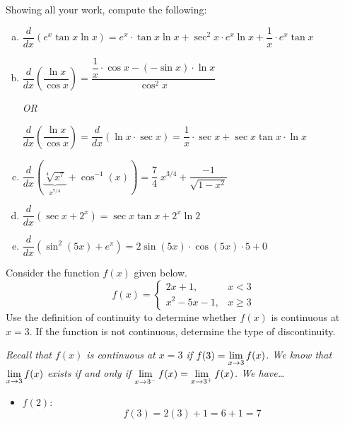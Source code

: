 \documentclass[12pt,letterpaper]{exam}
\begin{document}
\begin{questions}
\newpage
\question[20] Showing all your work, compute the following: \par\vspace{0.5cm}
	\begin{enumerate}[(a)]
	\item $\dfrac{d}{dx} \left(e^x \tan x \ln x \right)= e^x \cdot \tan x \ln x + \sec^2 x \cdot e^x \ln x + \dfrac{1}{x} \cdot e^x \tan x$ \vfill
	\item $\dfrac{d}{dx} \left( \dfrac{\ln x}{\cos x} \right)= \dfrac{\dfrac{1}{x} \cdot \cos x - (-\sin x) \cdot \ln x}{\cos^2 x}$ \par\vspace{0.5cm}
	
	\hspace{3cm} {\itshape OR} \par\vspace{0.5cm}
	
	$\dfrac{d}{dx} \left( \dfrac{\ln x}{\cos x} \right)= \dfrac{d}{dx} (\ln x \cdot \sec x )= \dfrac{1}{x} \cdot \sec x + \sec x \tan x \cdot \ln x$ \par\vspace{0.65cm}
	
	\item $\dfrac{d}{dx} \left( \underbrace{\sqrt[4]{x^7}}_{x^{7/4}} + \cos^{-1}(x) \right)= \dfrac{7}{4}\; x^{3/4} + \dfrac{-1}{\sqrt{1 - x^2}}$ \vfill
	\item $\dfrac{d}{dx} \left( \sec x + 2^x \right)= \sec x \tan x + 2^x \ln 2$ \vfill
	\item $\dfrac{d}{dx} \left( \sin^2(5x) + e^\pi \right)= 2 \sin(5x) \cdot \cos(5x) \cdot 5 + 0$ \vfill
	\end{enumerate}



\newpage
\question[20] Consider the function $f(x)$ given below.
	\[
	f(x)= 
	\begin{cases}
	2x + 1, & x < 3 \\
	x^2 - 5x - 1, & x \geq 3
	\end{cases}
	\]
Use the definition of continuity to determine whether $f(x)$ is continuous at $x= 3$. If the function is not continuous, determine the type of discontinuity. \pspace

{\itshape \tsol Recall that $f(x)$ is continuous at $x= 3$ if $\displaystyle f(3)= \lim_{x \to 3} f(x)$. We know that $\displaystyle\lim_{x \to 3} f(x)$ exists if and only if $\displaystyle\lim_{x \to 3^-} f(x)= \lim_{x \to 3^+} f(x)$. We have\dots
	\begin{itemize}
	\item $f(2)$: 
		\[
		f(3)= 2(3) + 1= 6 + 1= 7
		\] \par\vspace{0.5cm}
	

\end{itemize}}
\end{questions}
\end{document}
